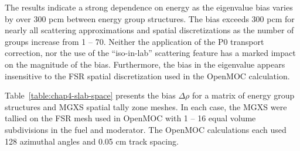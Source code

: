 \begin{table}[h!]
\begin{tabular}{c S[table-format=6.1] S[table-format=6.1] S[table-format=6.1] S[table-format=6.1] S[table-format=6.1]}
  \bottomrule
\end{tabular}
\end{table}

The results indicate a strong dependence on energy as the eigenvalue bias varies by over 300 pcm between energy group structures. The bias exceeds 300 pcm for nearly all scattering approximations and spatial discretizations as the number of groups increase from 1 -- 70. Neither the application of the P0 transport correction, nor the use of the ``iso-in-lab'' scattering feature has a marked impact on the magnitude of the bias. Furthermore, the bias in the eigenvalue appears insensitive to the \ac{FSR} spatial discretization used in the OpenMOC calculation.

Table~\ref{table:chap4-slab-space} presents the bias $\Delta\rho$ for a matrix of energy group structures and \ac{MGXS} spatial tally zone meshes. In each case, the \ac{MGXS} were tallied on the \ac{FSR} mesh used in OpenMOC with 1 -- 16 equal volume subdivisions in the fuel and moderator. The OpenMOC calculations each used 128 azimuthal angles and 0.05 cm track spacing.

